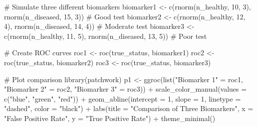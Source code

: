 \documentclass[
  11pt,
  letterpaper,
  oneside]{book}
\newenvironment{Shaded}{\begin{snugshade}}{\end{snugshade}}
\newcommand{\AttributeTok}[1]{\textcolor[rgb]{0.40,0.45,0.13}{#1}}
\newcommand{\CommentTok}[1]{\textcolor[rgb]{0.37,0.37,0.37}{#1}}
\newcommand{\DecValTok}[1]{\textcolor[rgb]{0.68,0.00,0.00}{#1}}
\newcommand{\FunctionTok}[1]{\textcolor[rgb]{0.28,0.35,0.67}{#1}}
\newcommand{\NormalTok}[1]{\textcolor[rgb]{0.00,0.23,0.31}{#1}}
\newcommand{\OtherTok}[1]{\textcolor[rgb]{0.00,0.23,0.31}{#1}}
\newcommand{\SpecialCharTok}[1]{\textcolor[rgb]{0.37,0.37,0.37}{#1}}
\newcommand{\StringTok}[1]{\textcolor[rgb]{0.13,0.47,0.30}{#1}}
\begin{document}
\begin{Shaded}
\begin{Highlighting}[]
\CommentTok{\# Simulate three different biomarkers}
\NormalTok{biomarker1 }\OtherTok{\textless{}{-}} \FunctionTok{c}\NormalTok{(}\FunctionTok{rnorm}\NormalTok{(n\_healthy, }\DecValTok{10}\NormalTok{, }\DecValTok{3}\NormalTok{), }\FunctionTok{rnorm}\NormalTok{(n\_diseased, }\DecValTok{15}\NormalTok{, }\DecValTok{3}\NormalTok{))  }\CommentTok{\# Good test}
\NormalTok{biomarker2 }\OtherTok{\textless{}{-}} \FunctionTok{c}\NormalTok{(}\FunctionTok{rnorm}\NormalTok{(n\_healthy, }\DecValTok{12}\NormalTok{, }\DecValTok{4}\NormalTok{), }\FunctionTok{rnorm}\NormalTok{(n\_diseased, }\DecValTok{14}\NormalTok{, }\DecValTok{4}\NormalTok{))  }\CommentTok{\# Moderate test}
\NormalTok{biomarker3 }\OtherTok{\textless{}{-}} \FunctionTok{c}\NormalTok{(}\FunctionTok{rnorm}\NormalTok{(n\_healthy, }\DecValTok{11}\NormalTok{, }\DecValTok{5}\NormalTok{), }\FunctionTok{rnorm}\NormalTok{(n\_diseased, }\DecValTok{13}\NormalTok{, }\DecValTok{5}\NormalTok{))  }\CommentTok{\# Poor test}

\CommentTok{\# Create ROC curves}
\NormalTok{roc1 }\OtherTok{\textless{}{-}} \FunctionTok{roc}\NormalTok{(true\_status, biomarker1)}
\NormalTok{roc2 }\OtherTok{\textless{}{-}} \FunctionTok{roc}\NormalTok{(true\_status, biomarker2)}
\NormalTok{roc3 }\OtherTok{\textless{}{-}} \FunctionTok{roc}\NormalTok{(true\_status, biomarker3)}

\CommentTok{\# Plot comparison}
\FunctionTok{library}\NormalTok{(patchwork)}
\NormalTok{p1 }\OtherTok{\textless{}{-}} \FunctionTok{ggroc}\NormalTok{(}\FunctionTok{list}\NormalTok{(}\StringTok{"Biomarker 1"} \OtherTok{=}\NormalTok{ roc1, }\StringTok{"Biomarker 2"} \OtherTok{=}\NormalTok{ roc2, }\StringTok{"Biomarker 3"} \OtherTok{=}\NormalTok{ roc3)) }\SpecialCharTok{+}
  \FunctionTok{scale\_color\_manual}\NormalTok{(}\AttributeTok{values =} \FunctionTok{c}\NormalTok{(}\StringTok{"blue"}\NormalTok{, }\StringTok{"green"}\NormalTok{, }\StringTok{"red"}\NormalTok{)) }\SpecialCharTok{+}
  \FunctionTok{geom\_abline}\NormalTok{(}\AttributeTok{intercept =} \DecValTok{1}\NormalTok{, }\AttributeTok{slope =} \DecValTok{1}\NormalTok{, }\AttributeTok{linetype =} \StringTok{"dashed"}\NormalTok{, }\AttributeTok{color =} \StringTok{"black"}\NormalTok{) }\SpecialCharTok{+}
  \FunctionTok{labs}\NormalTok{(}\AttributeTok{title =} \StringTok{"Comparison of Three Biomarkers"}\NormalTok{,}
       \AttributeTok{x =} \StringTok{"False Positive Rate"}\NormalTok{, }\AttributeTok{y =} \StringTok{"True Positive Rate"}\NormalTok{) }\SpecialCharTok{+}
  \FunctionTok{theme\_minimal}\NormalTok{()}


\end{Highlighting}
\end{Shaded}
\end{document}
